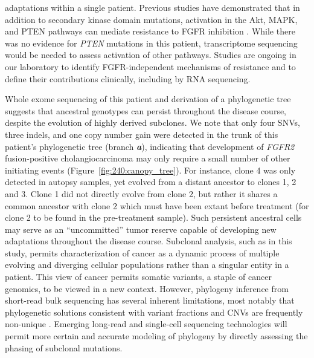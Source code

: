 adaptations within a single patient. Previous studies have demonstrated that in addition to secondary kinase domain mutations, activation in the Akt, MAPK, and PTEN pathways can mediate resistance to FGFR inhibition \cite{datta2017,goyal2017,malchers2017}. While there was no evidence for \textit{PTEN} mutations in this patient, transcriptome sequencing would be needed to assess activation of other pathways. Studies are ongoing in our laboratory to identify FGFR-independent mechanisms of resistance and to define their contributions clinically, including by RNA sequencing.

Whole exome sequencing of this patient and derivation of a phylogenetic tree suggests that ancestral genotypes can persist throughout the disease course, despite the evolution of highly derived subclones. We note that only four SNVs, three indels, and one copy number gain were detected in the trunk of this patient's phylogenetic tree (branch \textbf{\textit{a}}), indicating that development of \textit{FGFR2} fusion-positive cholangiocarcinoma may only require a small number of other initiating events (Figure~\ref{fig:240:canopy_tree}). For instance, clone 4 was only detected in autopsy samples, yet evolved from a distant ancestor to clones 1, 2 and 3. Clone 1 did not directly evolve from clone 2, but rather it shares a common ancestor with clone 2 which must have been extant before treatment (for clone 2 to be found in the pre-treatment sample). Such persistent ancestral cells may serve as an ``uncommitted'' tumor reserve capable of developing new adaptations throughout the disease course. Subclonal analysis, such as in this study, permits characterization of cancer as a dynamic process of multiple evolving and diverging cellular populations rather than a singular entity in a patient. This view of cancer permits somatic variants, a staple of cancer genomics, to be viewed in a new context. However, phylogeny inference from short-read bulk sequencing has several inherent limitations, most notably that phylogenetic solutions consistent with variant fractions and CNVs are frequently non-unique \cite{pradhan2018}. Emerging long-read and single-cell sequencing technologies will permit more certain and accurate modeling of phylogeny by directly assessing the phasing of subclonal mutations.

